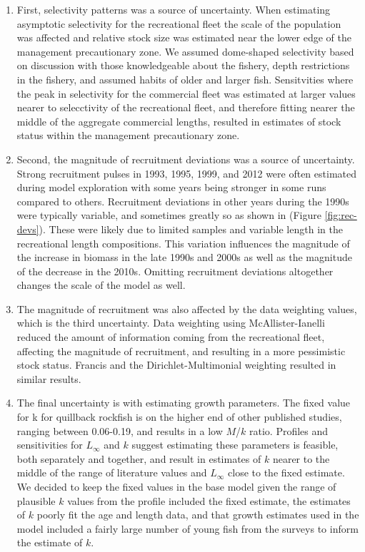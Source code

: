 \documentclass[11pt,
  english,
  a4paper,
]{article}
\begin{document}
\begin{enumerate}

  \item First, selectivity patterns was a source of uncertainty. When estimating asymptotic selectivity for the recreational fleet the scale of the population was affected and relative stock size was estimated near the lower edge of the management precautionary zone. We assumed dome-shaped selectivity based on discussion with those knowledgeable about the fishery, depth restrictions in the fishery, and assumed habits of older and larger fish. Sensitvities where the peak in selectivity for the commercial fleet was estimated at larger values nearer to selecctivity of the recreational fleet, and therefore fitting nearer the middle of the aggregate commercial lengths, resulted in estimates of stock status within the management precautionary zone.  
  
  \item Second, the magnitude of recruitment deviations was a source of uncertainty. Strong recruitment pulses in 1993, 1995, 1999, and 2012 were often estimated during model exploration with some years being stronger in some runs compared to others. Recruitment deviations in other years during the 1990s were typically variable, and sometimes greatly so as shown in (Figure \ref{fig:rec-devs}). These were likely due to limited samples and variable length in the recreational length compositions. This variation influences the magnitude of the increase in biomass in the late 1990s and  2000s as well as the magnitude of the decrease in the 2010s. Omitting recruitment deviations altogether changes the scale of the model as well. 
  
  \item The magnitude of recruitment was also affected by the data weighting values, which is the third uncertainty. Data weighting using McAllister-Ianelli reduced the amount of information coming from the recreational fleet, affecting the magnitude of recruitment, and resulting in a more pessimistic stock status. Francis and the Dirichlet-Multimonial weighting resulted in similar results. 
  
  \item The final uncertainty is with estimating growth parameters. The fixed value for k for quillback rockfish is on the higher end of other published studies, ranging between 0.06-0.19, and results in a low $M$/$k$ ratio. Profiles and sensitivities for $L_{\infty}$ and $k$ suggest estimating these parameters is feasible, both separately and together, and result in estimates of $k$ nearer to the middle of the range of literature values and $L_{\infty}$ close to the fixed estimate. We decided to keep the fixed values in the base model given the range of plausible $k$ values from the profile included the fixed estimate, the estimates of $k$ poorly fit the age and length data, and that growth estimates used in the model included a fairly large number of young fish from the surveys to inform the estimate of $k$.  
  
\end{enumerate}
\end{document}
